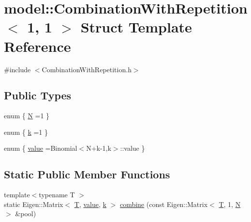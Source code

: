 \hypertarget{structmodel_1_1_combination_with_repetition_3_011_00_011_01_4}{}\section{model\+:\+:Combination\+With\+Repetition$<$ 1, 1 $>$ Struct Template Reference}
\label{structmodel_1_1_combination_with_repetition_3_011_00_011_01_4}


{\ttfamily \#include $<$Combination\+With\+Repetition.\+h$>$}

\subsection*{Public Types}
\begin{DoxyCompactItemize}
\item 
enum \{ \hyperlink{structmodel_1_1_combination_with_repetition_3_011_00_011_01_4_ab9acbc55796c36f436857ce3c2f2e5d8a4cec2fa58d80aedf2a2a4d827c6f0461}{N} =1
 \}
\item 
enum \{ \hyperlink{structmodel_1_1_combination_with_repetition_3_011_00_011_01_4_a8741b9f1de1bb51ff54e817a1a76443ba6052290081426c4efaa5b3132dbd8d91}{k} =1
 \}
\item 
enum \{ \hyperlink{structmodel_1_1_combination_with_repetition_3_011_00_011_01_4_a71cf554721ffff1de114e85c78b9f879a35d13811459cfab24203aa3b8a02b78b}{value} =Binomial$<$N+k-\/1,k$>$\+:\+:value
 \}
\end{DoxyCompactItemize}
\subsection*{Static Public Member Functions}
\begin{DoxyCompactItemize}
\item 
{\footnotesize template$<$typename T $>$ }\\static Eigen\+::\+Matrix$<$ \hyperlink{_spline_node_base__corder1_8h_a82692d3a5502b91460591f1d5504314a}{T}, \hyperlink{structmodel_1_1_combination_with_repetition_3_011_00_011_01_4_a71cf554721ffff1de114e85c78b9f879a35d13811459cfab24203aa3b8a02b78b}{value}, \hyperlink{structmodel_1_1_combination_with_repetition_3_011_00_011_01_4_a8741b9f1de1bb51ff54e817a1a76443ba6052290081426c4efaa5b3132dbd8d91}{k} $>$ \hyperlink{structmodel_1_1_combination_with_repetition_3_011_00_011_01_4_a79c0a95e996e659cdc6f3ff413cae095}{combine} (const Eigen\+::\+Matrix$<$ \hyperlink{_spline_node_base__corder1_8h_a82692d3a5502b91460591f1d5504314a}{T}, 1, \hyperlink{structmodel_1_1_combination_with_repetition_3_011_00_011_01_4_ab9acbc55796c36f436857ce3c2f2e5d8a4cec2fa58d80aedf2a2a4d827c6f0461}{N} $>$ \&pool)
\end{DoxyCompactItemize}



